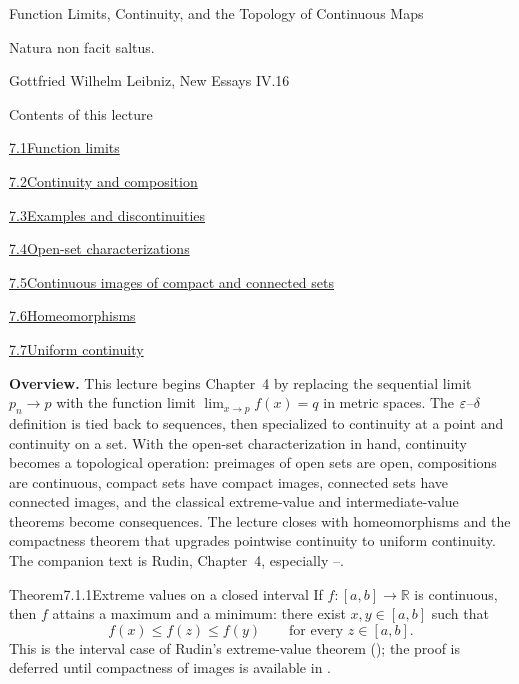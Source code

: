 \documentclass[main.tex]{subfiles}
\begin{document}
%
  {Function Limits, Continuity, and the Topology of Continuous Maps}

\epigraph{Natura non facit saltus.}{Gottfried Wilhelm Leibniz, New Essays IV.16}

\begin{lecturecontents}{Contents of this lecture}
  \item \hyperlink{7.1}{7.1\quad Function limits}
  \item \hyperlink{7.2}{7.2\quad Continuity and composition}
  \item \hyperlink{7.3}{7.3\quad Examples and discontinuities}
  \item \hyperlink{7.4}{7.4\quad Open-set characterizations}
  \item \hyperlink{7.5}{7.5\quad Continuous images of compact and connected sets}
  \item \hyperlink{7.6}{7.6\quad Homeomorphisms}
  \item \hyperlink{7.7}{7.7\quad Uniform continuity}
\end{lecturecontents}

\bigskip
\noindent\textbf{Overview.} This lecture begins Chapter~4 by replacing the sequential limit
$p_n\to p$ with the function limit $\lim_{x\to p}f(x)=q$ in metric spaces. The
$\varepsilon$--$\delta$ definition is tied back to sequences, then specialized to continuity at a
point and continuity on a set. With the open-set characterization in hand, continuity becomes a
topological operation: preimages of open sets are open, compositions are continuous, compact
sets have compact images, connected sets have connected images, and the classical extreme-value
and intermediate-value theorems become consequences. The lecture closes with homeomorphisms and
the compactness theorem that upgrades pointwise continuity to uniform continuity.
The companion text is Rudin, Chapter~4, especially --.

\clearpage

\begin{Obj}{Theorem}{7.1.1}{Extreme values on a closed interval}
If $f:[a,b]\to\mathbb R$ is continuous, then $f$ attains a maximum and a minimum: there exist
$x,y\in[a,b]$ such that
\[
  f(x)\le f(z)\le f(y)\qquad\text{for every }z\in[a,b].
\]
This is the interval case of Rudin's extreme-value theorem (); the proof is deferred
until compactness of images is available in .
\end{Obj}
\end{document}
